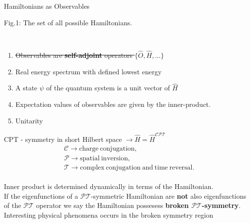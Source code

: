 \documentclass[10pt]{beamer}
\begin{document}
\begin{frame}{Hamiltonians as Observables}
    \\
    \hspace{1em}
    \begin{tiny}
        Fig.1: The set of all possible Hamiltonians.
    \end{tiny}
    \\
    \begin{enumerate}
        \item \textcolor{myNewColorA}{\st{Observables are \textbf{self-adjoint} operators $\{\hat{O}, \hat{H}, ...\}$}}
        \item \textcolor{myNewColorC}{Real energy spectrum with defined lowest energy}
        \item \textcolor{myNewColorC}{A state $\psi$ of the quantum system is a unit vector of $\hat{H}$}
        \item \textcolor{myNewColorC}{Expectation values of observables are given by the inner-product.}
        \item \textcolor{myNewColorC}{Unitarity}
    \end{enumerate}
\end{frame}


\begin{frame}{CPT - symmetry in short}
    \vspace{-1cm}
    Hilbert space $\rightarrow \hat{H} = \hat{H}^{\mathcal{CPT}}$ \\
    \vspace{-0.4cm}
    \begin{align*}
        & \mathcal{C} \rightarrow \mathrm{charge\:conjugation},\\
        & \mathcal{P} \rightarrow \mathrm{spatial\:inversion},\\
        & \mathcal{T} \rightarrow \mathrm{complex\:conjugation\:and\:time\:reversal}.
    \end{align*}\\
    \vspace{0.5cm}
    Inner product is determined dynamically in terms of the Hamiltonian.\\
    \pause
    \vspace{0.5cm}
    If the eigenfunctions of a $\mathcal{PT}$-symmetric Hamiltonian are \textbf{not} also eigenfunctions of the $\mathcal{PT}$ operator we say the Hamiltonian possesess \textbf{broken $\mathcal{PT}$-symmetry}.\\
    \pause
    \vspace{0.5cm}
    Interesting physical phenomena occurs in the broken symmetry region
\end{frame}
\end{document}
